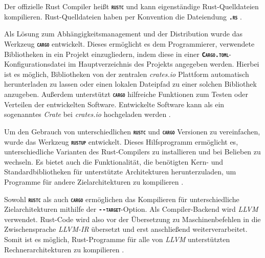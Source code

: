 Der offizielle Rust Compiler heißt \texttt{\textsc{\textbf{rustc}}} und kann eigenständige Rust-Quelldateien
kompilieren. Rust-Quelldateien haben per Konvention die Dateiendung \texttt{\textsc{\textbf{.rs}}} \cite{rustBook}.

Als Lösung zum Abhängigkeitsmanagement und der Distribution wurde das Werkzeug \texttt{\textsc{\textbf{cargo}}} 
entwickelt. Dieses ermöglicht es dem Programmierer, verwendete Bibliotheken in ein Projekt einzugliedern,
indem diese in einer \texttt{\textsc{\textbf{Cargo.toml}}}-Konfigurationsdatei im Hauptverzeichnis
des Projekts angegeben werden. Hierbei ist es möglich, Bibliotheken von der zentralen \textit{crates.io}
Plattform automatisch herunterladen zu lassen oder einen lokalen Dateipfad zu einer solchen
Bibliothek anzugeben.
Außerdem unterstützt \texttt{\textsc{\textbf{cargo}}} hilfreiche Funktionen zum Testen oder
Verteilen der entwickelten Software. Entwickelte Software kann als ein sogenanntes \textit{Crate} bei
\textit{crates.io} hochgeladen werden \cite{rustBook}.

Um den Gebrauch von unterschiedlichen \texttt{\textsc{\textbf{rustc}}} und \texttt{\textsc{\textbf{cargo}}} Versionen 
zu vereinfachen, wurde das Werkzeug \texttt{\textsc{\textbf{rustup}}} entwickelt. Dieses
Hilfsprogramm ermöglicht es, unterschiedliche Varianten des Rust-Compilers zu installieren und bei Belieben zu
wechseln. Es bietet auch die Funktionalität, die benötigten Kern- und Standardbibliotheken für unterstützte
Architekturen herunterzuladen, um Programme für andere Zielarchitekturen zu kompilieren \cite{rustupRepo}.

Sowohl \texttt{\textsc{\textbf{rustc}}} als auch \texttt{\textsc{\textbf{cargo}}} ermöglichen das Kompilieren für
unterschiedliche Zielarchitekturen mithilfe der
\texttt{\textsc{\textbf{-{}-target}}}-Option. Als Compiler-Backend wird \textit{LLVM} verwendet.
Rust-Code wird also vor der Übersetzung zu Maschinenbefehlen in die Zwischensprache
\textit{LLVM-IR} übersetzt und erst anschließend weiterverarbeitet.
Somit ist es möglich, Rust-Programme für alle von \textit{LLVM}
unterstützten Rechnerarchitekturen zu kompilieren \cite{rustGPU}.






